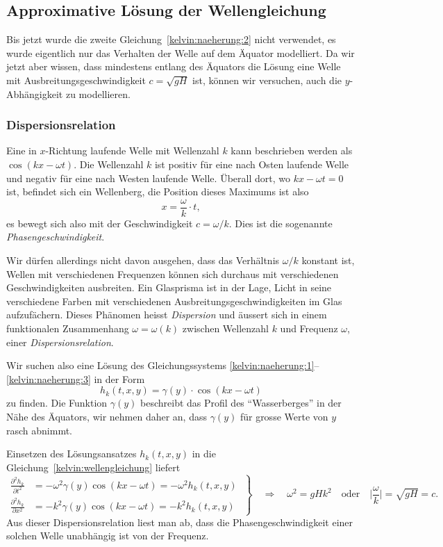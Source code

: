 \subsection{Approximative Lösung der Wellengleichung}
Bis jetzt wurde die zweite Gleichung~\eqref{kelvin:naeherung:2}
nicht verwendet, es wurde eigentlich nur das Verhalten der Welle auf
dem Äquator modelliert.
Da wir jetzt aber wissen, dass mindestens entlang des Äquators die Lösung
eine Welle mit Ausbreitungsgeschwindigkeit $c=\sqrt{gH}$ ist, können
wir versuchen, auch die $y$-Abhängigkeit zu modellieren.

\subsubsection{Dispersionsrelation}
Eine in $x$-Richtung laufende Welle mit Wellenzahl $k$ kann beschrieben werden
als $\cos(kx-\omega t)$.
Die Wellenzahl $k$ ist positiv für eine nach Osten laufende Welle und negativ
für eine nach Westen laufende Welle.
Überall dort, wo $kx-\omega t=0$ ist, befindet sich ein Wellenberg,
die Position dieses Maximums ist also
\[
x=\frac{\omega}{k}\cdot t,
\]
es bewegt sich also mit der Geschwindigkeit $c=\omega/k$.
Dies ist die sogenannte {\em Phasengeschwindigkeit}.
%

Wir dürfen allerdings nicht davon ausgehen, dass das Verhältnis $\omega/k$
konstant ist, Wellen mit verschiedenen Frequenzen können sich durchaus
mit verschiedenen Geschwindigkeiten ausbreiten.
Ein Glasprisma ist in der Lage, Licht in seine verschiedene Farben
mit verschiedenen Ausbreitungsgeschwindigkeiten im Glas aufzufächern. 
Dieses Phänomen heisst {\em Dispersion} und äussert sich in einem
%
funktionalen Zusammenhang
$
\omega = \omega(k)
$
zwischen Wellenzahl $k$ und Frequenz $\omega$, einer {\em Dispersionsrelation}.
%

Wir suchen also eine Lösung des Gleichungssystems
\eqref{kelvin:naeherung:1}--\eqref{kelvin:naeherung:3}
in der Form
\[
h_k(t,x,y) = \gamma(y)\cdot \cos(kx-\omega t)
\]
zu finden.
Die Funktion $\gamma(y)$ beschreibt das Profil des ``Wasserberges'' 
in der Nähe des Äquators, wir nehmen daher an, dass $\gamma(y)$ für grosse
Werte von $y$ rasch abnimmt.

Einsetzen des Lösungsansatzes $h_k(t,x,y)$ in die
Gleichung~\eqref{kelvin:wellengleichung} liefert
\begin{equation}
\left.
\begin{aligned}
\frac{\partial^2 h_k}{\partial t^2}
&=
- \omega^2 \gamma(y) \cos(kx-\omega t)
=
-\omega^2 h_k(t,x,y)
\\
\frac{\partial^2 h_k}{\partial x^2}
&=
-
k^2
\gamma(y)
\cos (kx-\omega t)
=
-k^2 h_k(t,x,y)
\end{aligned}
\;\right\}
\quad
\Rightarrow
\quad
\omega^2=gHk^2
\quad\text{oder}\quad
\biggl|
\frac{\omega}{k}\biggr|
=\sqrt{gH}=c.
\end{equation}
Aus dieser Dispersionsrelation
liest man ab, dass die Phasengeschwindigkeit einer solchen
Welle unabhängig ist von der Frequenz.

